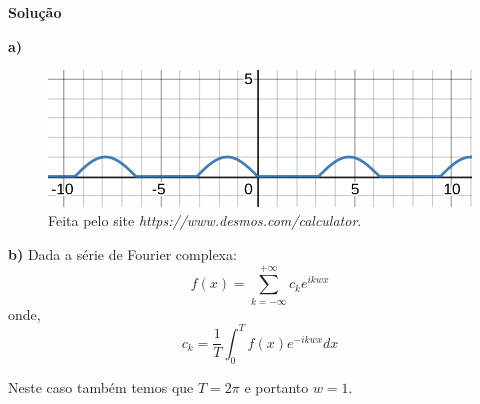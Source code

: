 \linespread{1.5}
\textbf{Solução}

\textbf{a)}
\begin{figure}[H]
    \centering
    \includegraphics[width = 0.7\linewidth]{fig/sf9.png}
    \caption{Feita pelo site \textit{https://www.desmos.com/calculator}.}
\end{figure}
\textbf{b)}
Dada a série de Fourier complexa:
\begin{equation}
    \label{eq:Fouriercomplexa}
    f(x) = \sum^{+\infty}_{k=-\infty} c_k e^{ikwx}
\end{equation}
onde, 
\begin{equation}
    \label{eq:ckFouerier}
    c_k = \frac{1}{T} \int^T_0 f(x)e^{-ikwx}dx
\end{equation}

Neste caso também temos que $T=2\pi$ e portanto $w = 1$.

